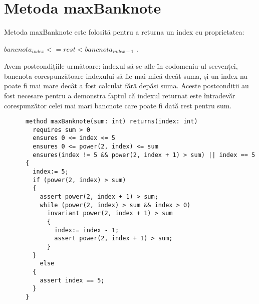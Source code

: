     \section{Metoda maxBanknote}
    Metoda maxBanknote este folosită pentru a returna un index cu proprietatea: \par
     $bancnota_{index} <= rest < bancnota_{index + 1}$  .\par
     Avem postcondițiile următoare: indexul să se afle în codomeniu-ul secvenței, bancnota corespunzătoare indexului să fie mai mică decât suma,
     și un index nu poate fi mai mare decât a fost calculat fără depăși suma.
     Aceste postcondiții au fost necesare pentru a demonstra faptul că indexul returnat este întradevăr corespunzător celei
     mai mari bancnote care poate fi dată rest pentru sum.
    \begin{lstlisting}
      method maxBanknote(sum: int) returns(index: int)
        requires sum > 0
        ensures 0 <= index <= 5
        ensures 0 <= power(2, index) <= sum
        ensures(index != 5 && power(2, index + 1) > sum) || index == 5 
      {
        index:= 5;
        if (power(2, index) > sum) 
        {
          assert power(2, index + 1) > sum;
          while (power(2, index) > sum && index > 0)
            invariant power(2, index + 1) > sum 
            {
              index:= index - 1;
              assert power(2, index + 1) > sum;
            }
        } 
          else 
        {
          assert index == 5;
        }
      }
    \end{lstlisting}


